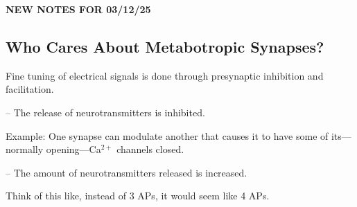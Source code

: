 \begin{center}
    \textbf{NEW NOTES FOR 03/12/25} \\
    \hrulefill
\end{center}

\subsection{Who Cares About Metabotropic Synapses?}

\begin{coloredlist}
    \item Fine tuning of electrical signals is done through presynaptic inhibition and facilitation.
    \begin{coloredlist}
        \item {} -- The release of neurotransmitters is inhibited. 
    \begin{coloredlist}
        \item Example: One synapse can modulate another that causes it to have some of its---normally opening---Ca\(^{2+}\) channels closed.
        \end{coloredlist}
        \item {} -- The amount of neurotransmitters released is increased. 
        \begin{coloredlist}
            \item Think of this like, instead of 3 APs, it would seem like 4 APs.
        \end{coloredlist}
    \end{coloredlist}
\end{coloredlist}

